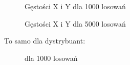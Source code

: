 \documentclass{article}
\begin{document}
\begin{enumerate}
\begin{figure}[h]
\begin{center}
{				}
				\caption{Gęstości X i Y dla 1000 losowań}
			\end{center}
		\end{figure}
		\begin{figure}[h]
			\begin{center}
				\caption{Gęstości X i Y dla 5000 losowań}
			\end{center}
		\end{figure}
	
		To samo dla dystrybuant:
		
		\begin{figure}[h]
			\begin{center}
				\caption{dla 1000 losowań}
			\end{center}
		\end{figure} 
		

\end{enumerate}
\end{document}
